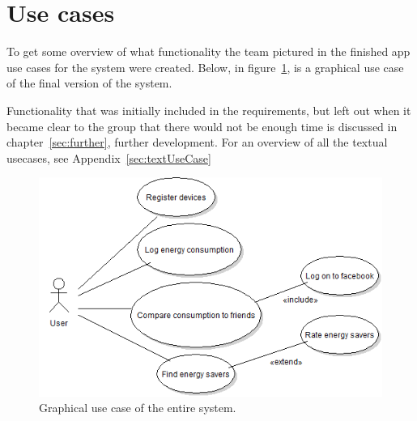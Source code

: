 \section{Use cases}
To get some overview of what functionality the team pictured in the finished app \glspl{use case} for the system were created. Below, in figure~\ref{fig:usecase}, is a graphical use case of the final version of the system.

Functionality that was initially included in the requirements, but left out when it became clear to the group that there would not be enough time is discussed in chapter~\ref{sec:further}, further development. For an overview of all the textual usecases, see Appendix~\ref{sec:textUseCase} \newline

\begin{figure}[H]
\includegraphics[width=\textwidth]{ch/specification/fig/currentUsecase.PNG}
\caption{Graphical use case of the entire system.}
\label{fig:usecase}
\end{figure}

